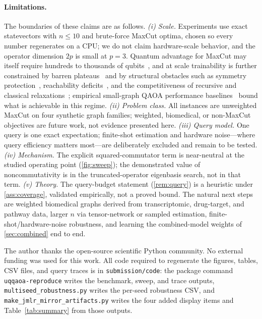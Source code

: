 \documentclass[aps,prresearch,reprint,amsmath,amssymb,floatfix,nofootinbib,superscriptaddress,longbibliography]{revtex4-2}
\theoremstyle{remark}
\begin{document}
\paragraph{Limitations.}
The boundaries of these claims are as follows.
\emph{(i) Scale.}  Experiments use exact statevectors with \(n\le10\) and
brute-force MaxCut optima, chosen so every number regenerates on a CPU; we do not
claim hardware-scale behavior, and the operator dimension \(2p\) is small at
\(p{=}3\).  Quantum advantage for MaxCut may itself require hundreds to thousands
of qubits~\cite{guerreschi2019}, and at scale trainability is further constrained
by barren plateaus~\cite{mcclean2018barren} and by structural obstacles such as
symmetry protection~\cite{bravyi2020obstacles}, reachability
deficits~\cite{akshay2020reach}, and the competitiveness of recursive and
classical relaxations~\cite{bravyi2022coloring}; empirical small-graph QAOA
performance baselines~\cite{lotshaw2021} bound what is achievable in this regime.
\emph{(ii) Problem class.}  All instances are unweighted MaxCut on four synthetic
graph families; weighted, biomedical, or non-MaxCut objectives are future work,
not evidence presented here.
\emph{(iii) Query model.}  One query is one exact expectation; finite-shot
estimation and hardware noise---where query efficiency matters most---are
deliberately excluded and remain to be tested.
\emph{(iv) Mechanism.}  The explicit squared-commutator term is near-neutral at
the studied operating point (\cref{fig:sweep}); the demonstrated value of
noncommutativity is in the truncated-operator eigenbasis search, not in that
term.
\emph{(v) Theory.}  The query-budget statement (\cref{rem:query}) is a heuristic
under \cref{ass:coverage}, validated empirically, not a proved bound.
The natural next steps are weighted biomedical graphs derived from
transcriptomic, drug-target, and pathway data, larger \(n\) via tensor-network or
sampled estimation, finite-shot/hardware-noise robustness, and learning the
combined-model weights of \cref{sec:combined} end to end.

\begin{acknowledgments}
The author thanks the open-source scientific Python community.  No external
funding was used for this work.  All code required to regenerate the figures,
tables, CSV files, and query traces is in \texttt{submission/code}: the package
command \texttt{uqqaoa-reproduce} writes the benchmark, sweep, and trace outputs,
\texttt{multiseed\_robustness.py} writes the per-seed robustness CSV, and
\texttt{make\_jmlr\_mirror\_artifacts.py} writes the four added display items and
Table~\ref{tab:summary} from those outputs.
\end{acknowledgments}



\end{document}
